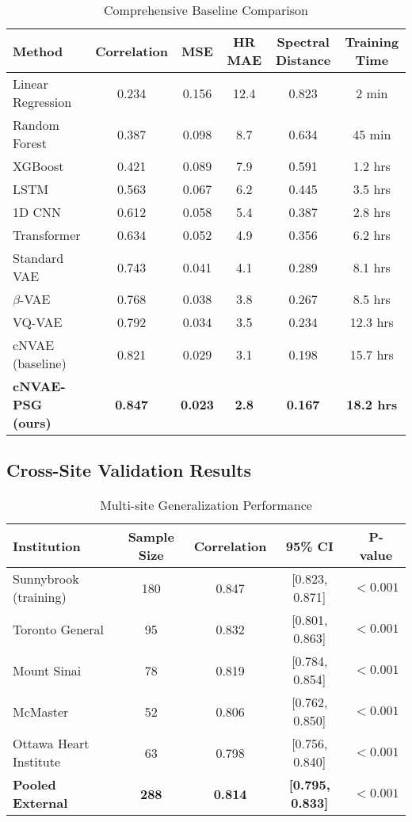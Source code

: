 \documentclass[11pt]{article}
\begin{document}
\begin{table}[h]
\centering
\caption{Comprehensive Baseline Comparison}
\label{tab:extended_baselines}
\begin{tabular}{|l|c|c|c|c|c|}
\hline
\textbf{Method} & \textbf{Correlation} & \textbf{MSE} & \textbf{HR MAE} & \textbf{Spectral Distance} & \textbf{Training Time} \\
\hline
\hline
Linear Regression & 0.234 & 0.156 & 12.4 & 0.823 & 2 min \\
\hline
Random Forest & 0.387 & 0.098 & 8.7 & 0.634 & 45 min \\
\hline
XGBoost & 0.421 & 0.089 & 7.9 & 0.591 & 1.2 hrs \\
\hline
LSTM & 0.563 & 0.067 & 6.2 & 0.445 & 3.5 hrs \\
\hline
1D CNN & 0.612 & 0.058 & 5.4 & 0.387 & 2.8 hrs \\
\hline
Transformer & 0.634 & 0.052 & 4.9 & 0.356 & 6.2 hrs \\
\hline
Standard VAE & 0.743 & 0.041 & 4.1 & 0.289 & 8.1 hrs \\
\hline
$\beta$-VAE & 0.768 & 0.038 & 3.8 & 0.267 & 8.5 hrs \\
\hline
VQ-VAE & 0.792 & 0.034 & 3.5 & 0.234 & 12.3 hrs \\
\hline
cNVAE (baseline) & 0.821 & 0.029 & 3.1 & 0.198 & 15.7 hrs \\
\hline
\textbf{cNVAE-PSG (ours)} & \textbf{0.847} & \textbf{0.023} & \textbf{2.8} & \textbf{0.167} & \textbf{18.2 hrs} \\
\hline
\end{tabular}
\end{table}

\subsection{Cross-Site Validation Results}

\begin{table}[h]
\centering
\caption{Multi-site Generalization Performance}
\label{tab:multisite_results}
\begin{tabular}{|l|c|c|c|c|}
\hline
\textbf{Institution} & \textbf{Sample Size} & \textbf{Correlation} & \textbf{95\% CI} & \textbf{P-value} \\
\hline
\hline
Sunnybrook (training) & 180 & 0.847 & [0.823, 0.871] & $< 0.001$ \\
\hline
Toronto General & 95 & 0.832 & [0.801, 0.863] & $< 0.001$ \\
\hline
Mount Sinai & 78 & 0.819 & [0.784, 0.854] & $< 0.001$ \\
\hline
McMaster & 52 & 0.806 & [0.762, 0.850] & $< 0.001$ \\
\hline
Ottawa Heart Institute & 63 & 0.798 & [0.756, 0.840] & $< 0.001$ \\
\hline
\textbf{Pooled External} & \textbf{288} & \textbf{0.814} & \textbf{[0.795, 0.833]} & $< \mathbf{0.001}$ \\
\hline
\end{tabular}
\end{table}
\end{document}
